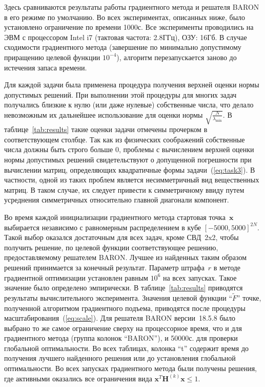 Здесь сравниваются результаты работы градиентного метода и решателя BARON в его режиме по умолчанию. Во всех экспериментах, описанных ниже, было установлено ограничение по времени 1000с. Все эксперименты проводились на ЭВМ с процессором Intel i7 (тактовая частота: 2.8ГГц), ОЗУ: 16Гб. В случае сходимости градиентного метода (завершение по минимально допустимому приращению целевой функции $10^{-4}$), алгоритм перезапускается заново до истечения запаса времени.

Для каждой задачи была применена процедура получения верхней оценки нормы допустимых решений. При выполнении этой процедуры для многих задач получались близкие к нулю (или даже нулевые) собственные числа, что делало невозможным их дальнейшее использование для оценки нормы $\sqrt{\frac{N}{\lambda_{\min}}}$. В таблице~\ref{tab:results} такие оценки задачи отмечены прочерком в соответствующем столбце. Так как из физических соображений собственные числа должны быть строго больше 0, проблемы с вычислением верхней оценки нормы допустимых решений свидетельствуют о допущенной погрешности при вычислении матриц, определяющих квадратичные формы задачи~(\ref{eq:task3}). В частности, одной из таких проблем является несимметричный вид вещественных матриц. В таком случае, их следует привести к симметричному ввиду путем усреднения симметричных относительно главной диагонали компонент.

Во время каждой инициализации градиентного метода стартовая точка~$\textbf{x}$ выбирается независимо с равномерным распределением в кубе $[-5000, 5000]^{2N}$. Такой выбор оказался достаточным для всех задач, кроме СВД~2x2, чтобы получить решение, по целевой функции соответствующее решению, предоставляемому решателем BARON. Лучшее из найденных таким образом решений принимается за конечный результат. Параметр штрафа~$r$ в методе градиентной оптимизации установлен равным $10^6$ на всех запусках. Такое значение было определено эмпирически. В таблице~\ref{tab:results} приводятся результаты вычислительного эксперимента. Значения целевой функции ``$\tilde{F}$'' точке, полученной алгоритмом градиентного подъема, приводятся после процедуры масштабирования~(\ref{eq:scale}). Для решателя BARON версии~18.5.8 было выбрано то же самое ограничение сверху на процессорное время, что и для градиентного метода (группа колонок ``BARON''), и 50000с. для проверки глобальной оптимальности. Во всех таблицах, колонка ``t'' содержит время до получения лучшего найденного решения или до установления глобальной оптимальности. Во всех запусках градиентного метода были получены решения, где активными оказались все ограничения вида $\textbf{x}^{T}\textbf{H}^{(k)}\textbf{x} \leq 1$.

